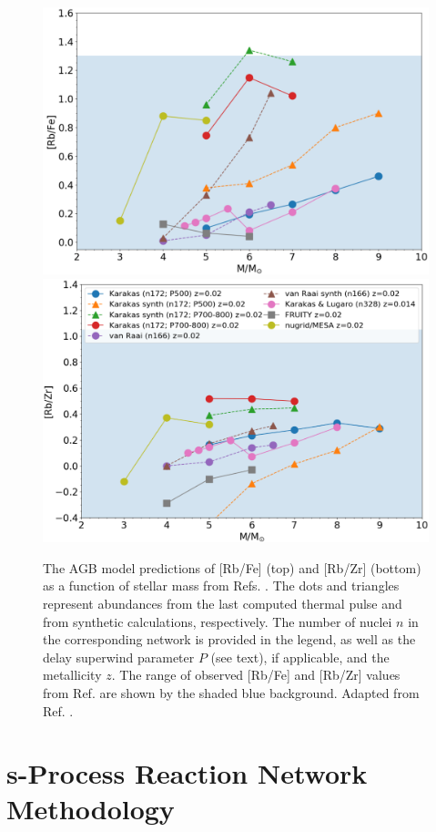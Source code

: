 \begin{figure}[t]
\centering
\includegraphics[width=5.0in]{Chapter-3/figs/RbProblem1.png}
\includegraphics[width=5.0in]{Chapter-3/figs/RbProblem2.png}
\caption{\label{fig:RbProblem}The AGB model predictions of [Rb/Fe] (top) and [Rb/Zr] (bottom) as a function of stellar mass from Refs. \cite{Karakas2012,van2012,Karakas2016,Pignatari2016}. The dots and triangles represent abundances from the last computed thermal pulse and from synthetic calculations, respectively. The number of nuclei $n$ in the corresponding network is provided in the legend, as well as the delay superwind parameter $P$ (see text), if applicable, and the metallicity $z$. The range of observed [Rb/Fe] and [Rb/Zr] values from Ref. \cite{Perez2017} are shown by the shaded blue background. Adapted from Ref. \cite{Perez2017}.}
\end{figure}

\section{s-Process Reaction Network Methodology} \label{sec:network_method}



